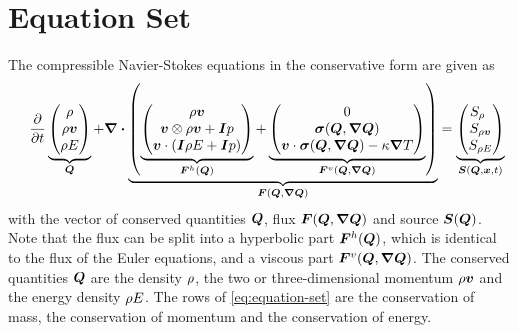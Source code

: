\documentclass[runningheads]{llncs}
\newcommand{\eqA}{}
\newcommand{\eqB}{(}
\newcommand{\eqMultiA}{(}
\newcommand{\eqMultiB}{)}
\DeclareRobustCommand{\pcrefSingle}[1]{%
\begingroup%
  \renewcommand{\eqA}{(}\renewcommand{\eqB}{}%
\cref{#1}%
\endgroup%
}
\DeclareRobustCommand{\pcrefMulti}[1]{%
\begingroup%
    \renewcommand{\eqMultiA}{}\renewcommand{\eqMultiB}{}%
    (\cref{#1})%
\endgroup%
}
\DeclareRobustCommand{\pcref}[1]{%
\IfSubStr{#1}{,}{\pcrefMulti{#1}}{\pcrefSingle{#1}}%
}
\begin{document}
\section{Equation Set}
\newcommand{\diffCoeff}{\varepsilon}%
\newcommand{\hyperFluxDef}{
  \begin{pmatrix}
    \Qj \\
    \Qv  \otimes \Qj + \bm{I} \pressure  \\
    \Qv \cdot (\bm{I} \QE + \bm{I} \pressure)
  \end{pmatrix}
}%
\newcommand{\viscFluxDef}{
  \begin{pmatrix}
    0\\
     \stressT (\Q, \gradQ)  \\
     \Qv \cdot \stressT (\Q, \gradQ) - \kappa \gradient{T}
   \end{pmatrix}
}%
The compressible Navier-Stokes equations in the conservative form are given as%
\begin{equation}
 \label{eq:equation-set} 
\quad
  \pdv{}{t}
  \underbrace{
  \begin{pmatrix}
    \Qrho\\
    \Qj\\
    \QE
    \end{pmatrix}}_{\Q}
  +
  \divergence{
  \underbrace{
  \left(
   \underbrace{\hyperFluxDef}_{\hyperFlux(\Q)}
+
\underbrace{\viscFluxDef}_{\viscFlux(\Q, \gradQ)}
  \right)}_{\flux(\Q, \gradQ)}}
 =
  \underbrace{
  \begin{pmatrix}
    \source[\Qrho\phantom{\Qrho}]\\
    \source[\Qj]\\
    \source[\QE]
    \end{pmatrix}}_{\source(\Q, \bm{x}, t)}
\end{equation}
with the vector of conserved quantities $\bm{Q}$, flux $\flux(\Q, \gradQ)$ and source $\source(\Q)$.
Note that the flux can be split into a hyperbolic part $\bm{F}^{h}(\bm{Q})$,
which is identical to the flux of the Euler equations,
and a viscous part $\viscFlux(\Q, \gradQ)$.
The conserved quantities
\(\bm{Q}\)
are the density $\rho$, the two or three-dimensional momentum $\rho \bm{v}$ and the energy density $\rho E$.
The rows of \cref{eq:equation-set} are the conservation of mass, the conservation of momentum and the conservation of energy.
\end{document}
